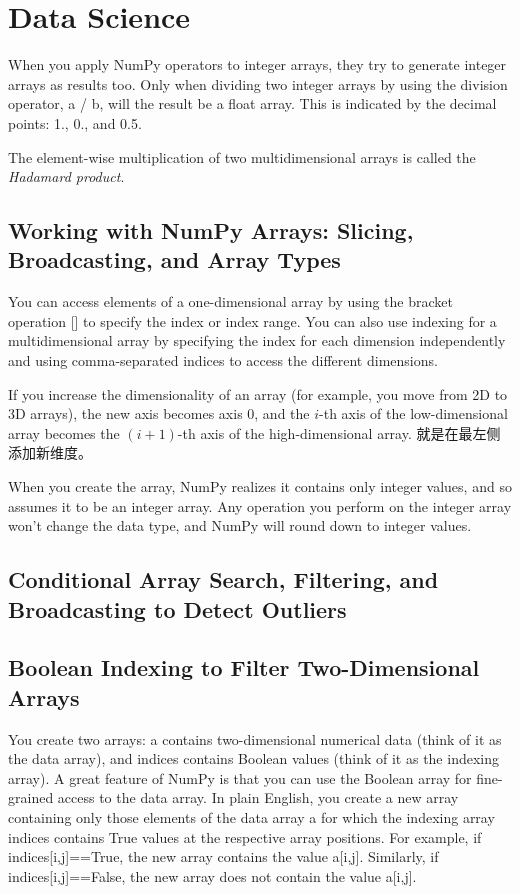 \chapter{Data Science\label{Ch03}}
When you apply NumPy operators to integer arrays, they try to generate integer arrays as results too. Only when dividing two integer arrays by using the division operator, a / b, will the result be a float array. This is indicated by the decimal points: 1., 0., and 0.5.

The element-wise multiplication of two multidimensional arrays is called the \textit{Hadamard product}.

\section{Working with NumPy Arrays: Slicing, Broadcasting, and Array Types}
You can access elements of a one-dimensional array by using the bracket operation [] to specify the index or index range. You can also use indexing for a multidimensional array by specifying the index for each dimension independently and using comma-separated indices to access the different dimensions.

If you increase the dimensionality of an array (for example, you move from 2D to 3D arrays), the new axis becomes axis 0, and the $i$-th axis of the low-dimensional array becomes the $(i + 1)$-th axis of the high-dimensional array. 就是在最左侧添加新维度。

When you create the array, NumPy realizes it contains only integer values, and so assumes it to be an integer array. Any operation you perform on the integer array won't change the data type, and NumPy will round down to integer values.
\section{Conditional Array Search, Filtering, and Broadcasting to Detect Outliers}

\section{Boolean Indexing to Filter Two-Dimensional Arrays} You create two arrays: a contains two-dimensional numerical data (think of it as the data array), and indices contains Boolean values (think of it as the indexing array). A great feature of NumPy is that you can use the Boolean array for fine-grained access to the data array. In plain English, you create a new array containing only those elements of the data array a for which the indexing array indices contains True values at the respective array positions. For example, if indices[i,j]==True, the new array contains the value a[i,j]. Similarly, if indices[i,j]==False, the new array does not contain the value a[i,j].